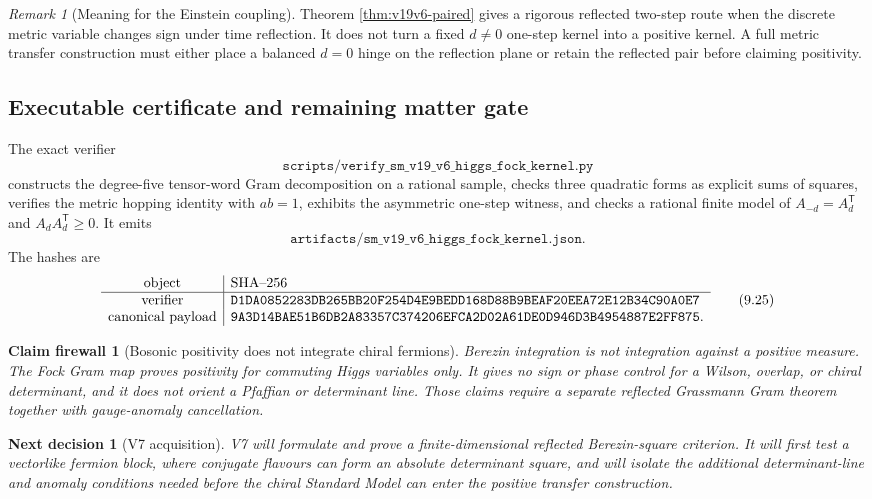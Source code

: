 \documentclass[11pt]{article}
\newtheorem{firewall}[theorem]{Claim firewall}
\newtheorem{decision}[theorem]{Next decision}
\theoremstyle{remark}
\newtheorem{remark}[theorem]{Remark}
\begin{document}
\begin{remark}[Meaning for the Einstein coupling]
\label{rem:v19v6-einstein}
Theorem \ref{thm:v19v6-paired} gives a rigorous reflected two-step route
when the discrete metric variable changes sign under time reflection.
It does not turn a fixed \(d\neq0\) one-step kernel into a positive kernel.
A full metric transfer construction must either place a balanced
\(d=0\) hinge on the reflection plane or retain the reflected pair before
claiming positivity.
\end{remark}

\subsection{Executable certificate and remaining matter gate}

The exact verifier
\[
 \texttt{scripts/verify\_sm\_v19\_v6\_higgs\_fock\_kernel.py}  \tag{9.23}
\]
constructs the degree-five tensor-word Gram decomposition on a rational
sample, checks three quadratic forms as explicit sums of squares, verifies
the metric hopping identity with \(ab=1\), exhibits the asymmetric
one-step witness, and checks a rational finite model of
\(A_{-d}=A_d^{\mathsf T}\) and \(A_dA_d^{\mathsf T}\geq0\).
It emits
\[
 \texttt{artifacts/sm\_v19\_v6\_higgs\_fock\_kernel.json}.      \tag{9.24}
\]
The hashes are
\[
\begin{array}{c|l}
\hbox{object}&\hbox{SHA--256}\\ \hline
\hbox{verifier}&
\texttt{D1DA0852283DB265BB20F254D4E9BEDD168D88B9BEAF20EEA72E12B34C90A0E7}\\
\hbox{canonical payload}&
\texttt{9A3D14BAE51B6DB2A83357C374206EFCA2D02A61DE0D946D3B4954887E2FF875}.
\end{array}                                                     \tag{9.25}
\]

\begin{firewall}[Bosonic positivity does not integrate chiral fermions]
\label{fire:v19v6-fermions}
Berezin integration is not integration against a positive measure.
The Fock Gram map proves positivity for commuting Higgs variables only.
It gives no sign or phase control for a Wilson, overlap, or chiral
determinant, and it does not orient a Pfaffian or determinant line.  Those
claims require a separate reflected Grassmann Gram theorem together with
gauge-anomaly cancellation.
\end{firewall}

\begin{decision}[V7 acquisition]
\label{dec:v19v6-next}
V7 will formulate and prove a finite-dimensional reflected Berezin-square
criterion.  It will first test a vectorlike fermion block, where conjugate
flavours can form an absolute determinant square, and will isolate the
additional determinant-line and anomaly conditions needed before the
chiral Standard Model can enter the positive transfer construction.
\end{decision}
\end{document}
